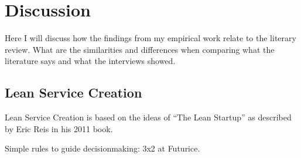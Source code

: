 
\chapter{Discussion}
\label{chapter:discussion}

Here I will discuss how the findings from my empirical work relate to the literary review. What are the similarities and differences when comparing what the literature says and what the interviews showed.

\section{Lean Service Creation}
\label{section:lsc}


Lean Service Creation is based on the ideas of ``The Lean Startup'' as described by Eric Reis in his 2011 book.\cite{ries2011lean}



Simple rules to guide decisionmaking: 3x2 at Futurice.
